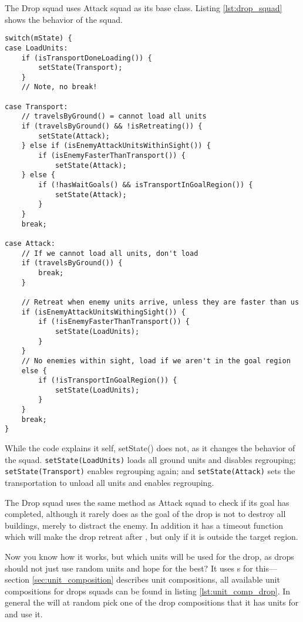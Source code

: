 The Drop squad uses Attack squad as its base class. Listing \ref{lst:drop_squad} shows the behavior
of the squad.

\clearpage
\begin{lstlisting}[caption={Drop squad behavior},label={lst:drop_squad}]
switch(mState) {
case LoadUnits:
	if (isTransportDoneLoading()) {
		setState(Transport);
	}
	// Note, no break!

case Transport:
	// travelsByGround() = cannot load all units
	if (travelsByGround() && !isRetreating()) {
		setState(Attack);
	} else if (isEnemyAttackUnitsWithinSight()) {
		if (isEnemyFasterThanTransport()) {
			setState(Attack);
	} else {
		if (!hasWaitGoals() && isTransportInGoalRegion()) {
			setState(Attack);
		}
	}
	break;

case Attack:
	// If we cannot load all units, don't load
	if (travelsByGround()) {
		break;
	}

	// Retreat when enemy units arrive, unless they are faster than us
	if (isEnemyAttackUnitsWithingSight()) {
		if (!isEnemyFasterThanTransport()) {
			setState(LoadUnits);
		}
	}
	// No enemies within sight, load if we aren't in the goal region
	else {
		if (!isTransportInGoalRegion()) {
			setState(LoadUnits);
		}
	}
	break;
}
\end{lstlisting}
While the code explains it self, setState() does not, as it changes the behavior of the squad.
\texttt{setState(LoadUnits)} loads all ground units and disables regrouping;
\texttt{setState(Transport)} enables regrouping again; and \texttt{setState(Attack)} sets the
transportation to unload all units and enables regrouping.

The Drop squad uses the same method as Attack squad to check if its goal has completed, although it
rarely does as the goal of the drop is not to destroy all buildings, merely to distract the
enemy. In addition it has a timeout function which will make the drop retreat after
\squadDropAttackTimeout, but only if it is outside the target region.

Now you know how it works, but which units will be used for the drop, as drops should not just use
random units and hope for the best? It uses s for this—section
\ref{sec:unit_composition} describes unit compositions, all available unit compositions for drops
squads can be found in listing \ref{lst:unit_comp_drop}. In general the  will
at random pick one of the drop compositions that it has units for and use it.


